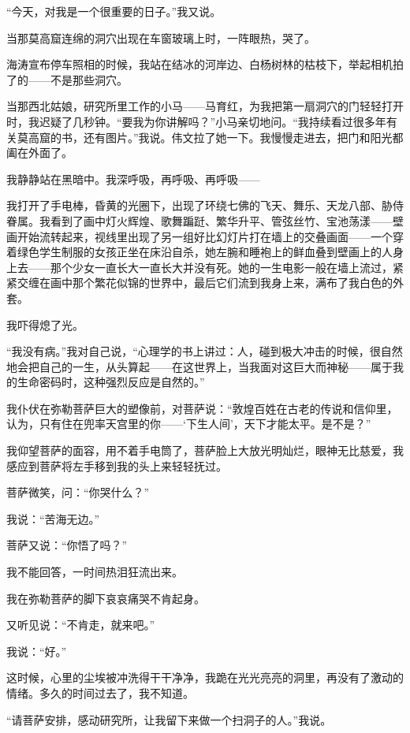 \par “今天，对我是一个很重要的日子。”我又说。
\par 当那莫高窟连绵的洞穴出现在车窗玻璃上时，一阵眼热，哭了。
\par 海涛宣布停车照相的时候，我站在结冰的河岸边、白杨树林的枯枝下，举起相机拍了的——不是那些洞穴。
\par 
\par 当那西北姑娘，研究所里工作的小马——马育红，为我把第一扇洞穴的门轻轻打开时，我迟疑了几秒钟。“要我为你讲解吗？”小马亲切地问。“我持续看过很多年有关莫高窟的书，还有图片。”我说。伟文拉了她一下。我慢慢走进去，把门和阳光都阖在外面了。
\par 我静静站在黑暗中。我深呼吸，再呼吸、再呼吸——
\par 我打开了手电棒，昏黄的光圈下，出现了环绕七佛的飞天、舞乐、天龙八部、胁侍眷属。我看到了画中灯火辉煌、歌舞蹁跹、繁华升平、管弦丝竹、宝池荡漾——壁画开始流转起来，视线里出现了另一组好比幻灯片打在墙上的交叠画面——一个穿着绿色学生制服的女孩正坐在床沿自杀，她左腕和睡袍上的鲜血叠到壁画上的人身上去——那个少女一直长大一直长大并没有死。她的一生电影一般在墙上流过，紧紧交缠在画中那个繁花似锦的世界中，最后它们流到我身上来，满布了我白色的外套。
\par 我吓得熄了光。
\par “我没有病。”我对自己说，“心理学的书上讲过：人，碰到极大冲击的时候，很自然地会把自己的一生，从头算起——在这世界上，当我面对这巨大而神秘——属于我的生命密码时，这种强烈反应是自然的。”
\par 
\par 我仆伏在弥勒菩萨巨大的塑像前，对菩萨说：“敦煌百姓在古老的传说和信仰里，认为，只有住在兜率天宫里的你——‘下生人间’，天下才能太平。是不是？”
\par 我仰望菩萨的面容，用不着手电筒了，菩萨脸上大放光明灿烂，眼神无比慈爱，我感应到菩萨将左手移到我的头上来轻轻抚过。
\par 菩萨微笑，问：“你哭什么？”
\par 我说：“苦海无边。”
\par 菩萨又说：“你悟了吗？”
\par 我不能回答，一时间热泪狂流出来。
\par 我在弥勒菩萨的脚下哀哀痛哭不肯起身。
\par 又听见说：“不肯走，就来吧。”
\par 我说：“好。”
\par 这时候，心里的尘埃被冲洗得干干净净，我跪在光光亮亮的洞里，再没有了激动的情绪。多久的时间过去了，我不知道。
\par “请菩萨安排，感动研究所，让我留下来做一个扫洞子的人。”我说。
